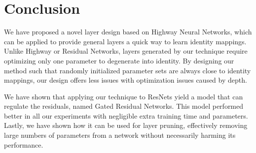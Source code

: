 \documentclass{article} %
\begin{document}
\section{Conclusion}

We have proposed a novel layer design based on Highway Neural Networks, which can be applied to provide general layers a quick way to learn identity mappings. Unlike Highway or Residual Networks, layers generated by our technique require optimizing only one parameter to degenerate into identity. By designing our method such that randomly initialized parameter sets are always close to identity mappings, our design offers less issues with optimization issues caused by depth.

We have shown that applying our technique to ResNets yield a model that can regulate the residuals, named Gated Residual Networks. This model performed better in all our experiments with negligible extra training time and parameters. Lastly, we have shown how it can be used for layer pruning, effectively removing large numbers of parameters from a network without necessarily harming its performance.









\end{document}
